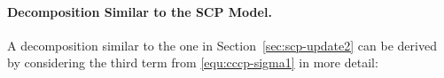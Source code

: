 \paragraph{Decomposition Similar to the SCP Model.}


A decomposition similar to the one in Section~\ref{sec:scp-update2} can be derived
by considering the third term from \eqref{equ:cccp-sigma1} in more detail:

